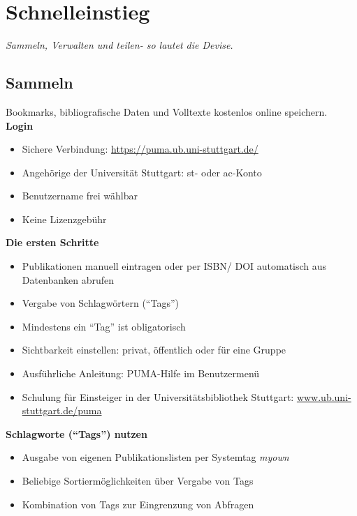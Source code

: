 \section{Schnelleinstieg}
\textit{Sammeln, Verwalten und teilen- so lautet die Devise.}
\subsection{Sammeln}
Bookmarks, bibliografische Daten und Volltexte kostenlos online speichern.\newline\newline
\textbf{Login}
\begin{itemize}
\item Sichere Verbindung: \url{https://puma.ub.uni-stuttgart.de/}
\item Angehörige der Universität Stuttgart: st- oder ac-Konto
\item Benutzername frei wählbar
\item Keine Lizenzgebühr
\end{itemize}
\textbf{Die ersten Schritte}
\begin{itemize}
\item Publikationen manuell eintragen oder per ISBN/ DOI automatisch aus Datenbanken abrufen
\item Vergabe von Schlagwörtern (\enquote{Tags})
\item Mindestens ein \enquote{Tag} ist obligatorisch
\item Sichtbarkeit einstellen: privat, öffentlich oder für eine Gruppe
\item Ausführliche Anleitung: PUMA-Hilfe im Benutzermenü
\item Schulung für Einsteiger in der Universitätsbibliothek Stuttgart: \url{www.ub.uni-stuttgart.de/puma}
\end{itemize}
\textbf{Schlagworte (\enquote{Tags}) nutzen}
\begin{itemize}
\item Ausgabe von eigenen Publikationslisten per Systemtag \textit{myown}
\item Beliebige Sortiermöglichkeiten über Vergabe von Tags
\item Kombination von Tags zur Eingrenzung von Abfragen
\end{itemize}
